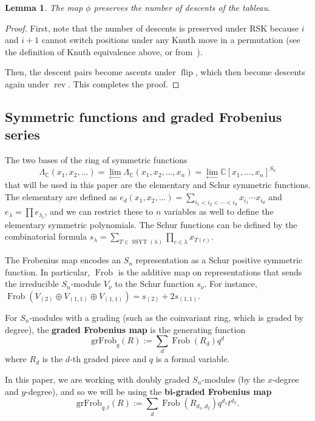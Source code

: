 \documentclass[11pt]{article}
\newtheorem{lemma}[theo]{Lemma}
\theoremstyle{definition}
\numberwithin{equation}{section}
\DeclareMathOperator{\flip}{flip}
\DeclareMathOperator{\Frob}{Frob}
\DeclareMathOperator{\rev}{rev}
\DeclareMathOperator{\SSYT}{SSYT}
\newcommand{\grFrob}{\mathrm{grFrob}}
\begin{document}
\begin{lemma}
	The map $\phi$ preserves the number of descents of the tableau.
\end{lemma}

\begin{proof}
	First, note that the number of descents is preserved under RSK because $i$ and $i+1$ cannot switch positions under any Knuth move in a permutation (see the definition of Knuth equivalence above, or from~\cite{Fulton}).
	
	Then, the descent pairs become ascents under $\flip$, which then become descents again under $\rev$.  This completes the proof.
\end{proof}

\subsection{Symmetric functions and graded Frobenius series}\label{sec:Frobenius}

The two bases of the ring of symmetric functions $$\Lambda_{\mathbb{C}}(x_1,x_2,\ldots)=\lim_{\leftarrow} \Lambda_{\mathbb{C}}(x_1,x_2,\ldots,x_n)=\lim_{\leftarrow}\mathbb{C}[x_1,\ldots,x_n]^{S_n}$$ that will be used in this paper are the elementary and Schur symmetric functions.  The elementary are defined as $e_d(x_1,x_2,\ldots)=\sum_{i_1<i_2<\cdots < i_d} x_{i_1}\cdots x_{i_d}$ and $e_\lambda=\prod e_{\lambda_i}$, and we can restrict these to $n$ variables as well to define the elementary symmetric polynomials.  The Schur functions can be defined by the combinatorial formula $s_\lambda=\sum_{T\in \SSYT(\lambda)}\prod_{c \in \lambda} x_{T(c)}$.

The Frobenius map encodes an $S_n$ representation as a Schur positive symmetric function.  In particular, $\Frob$ is the additive map on representations that sends the irreducible $S_n$-module $V_\nu$ to the Schur function $s_\nu$.  For instance, $\Frob(V_{(2)}\oplus V_{(1,1)}\oplus V_{(1,1)})=s_{(2)}+2s_{(1,1)}$.

For $S_n$-modules with a grading (such as the coinvariant ring, which is graded by degree), the \textbf{graded Frobenius map} is the generating function $$\grFrob_q(R):=\sum_d \Frob(R_d)q^d$$ where $R_d$ is the $d$-th graded piece and $q$ is a formal variable.

In this paper, we are working with doubly graded $S_n$-modules (by the $x$-degree and $y$-degree), and so we will be using the \textbf{bi-graded Frobenius map} $$\grFrob_{q,t}(R):=\sum_d \Frob(R_{d_1,d_2})q^{d_1}t^{d_2}.$$
\end{document}
